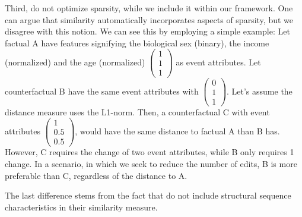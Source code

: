 \documentclass[./../../paper.tex]{subfiles}
\begin{document}
Third, \autocite{hsieh_DiCE4ELInterpretingProcess_2021} do not optimize sparsity, while we include it within our framework. One can argue that similarity automatically incorporates aspects of sparsity, but we disagree with this notion. We can see this by employing a simple example: Let factual A have features signifying the biological sex (binary), the income (normalized) and the age (normalized) $\begin{pmatrix}1\\1\\1\end{pmatrix}$ as event attributes. Let counterfactual B have the same event attributes with $\begin{pmatrix}0\\1\\1\end{pmatrix}$. Let's assume the distance measure uses the L1-norm. Then, a counterfactual C with event attributes $\begin{pmatrix}1\\0.5\\0.5\end{pmatrix}$, would have the same distance to factual A than B has. However, C requires the change of two event attributes, while B only requires 1 change. In a scenario, in which we seek to reduce the number of edits, B is more preferable than C, regardless of the distance to A.

The last difference stems from the fact that \citeauthor{hsieh_DiCE4ELInterpretingProcess_2021} do not include structural sequence characteristics in their similarity measure. 
\end{document}
